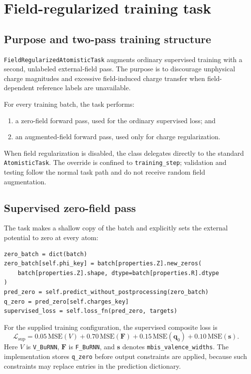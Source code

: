 \documentclass[11pt,a4paper]{article}
\newcommand{\vect}[1]{\bm{#1}}
\begin{document}
\appendix
\section{Field-regularized training task}
\label{app:field}

\subsection{Purpose and two-pass training structure}

\texttt{FieldRegularizedAtomisticTask} augments ordinary supervised training
with a second, unlabeled external-field pass.  The purpose is to discourage
unphysical charge magnitudes and excessive field-induced charge transfer when
field-dependent reference labels are unavailable.

For every training batch, the task performs:
\begin{enumerate}
  \item a zero-field forward pass, used for the ordinary supervised loss; and
  \item an augmented-field forward pass, used only for charge regularization.
\end{enumerate}
When field regularization is disabled, the class delegates directly to the
standard \texttt{AtomisticTask}.  The override is confined to
\texttt{training\_step}; validation and testing follow the normal task path and
do not receive random field augmentation.

\subsection{Supervised zero-field pass}

The task makes a shallow copy of the batch and explicitly sets the external
potential to zero at every atom:
\begin{lstlisting}[style=pythonstyle]
zero_batch = dict(batch)
zero_batch[self.phi_key] = batch[properties.Z].new_zeros(
    batch[properties.Z].shape, dtype=batch[properties.R].dtype
)
pred_zero = self.predict_without_postprocessing(zero_batch)
q_zero = pred_zero[self.charges_key]
supervised_loss = self.loss_fn(pred_zero, targets)
\end{lstlisting}
For the supplied training configuration, the supervised composite loss is
\begin{equation}
  \mathcal L_{\mathrm{sup}}
  =0.05\,\mathrm{MSE}(V)
  +0.70\,\mathrm{MSE}(\vect F)
  +0.15\,\mathrm{MSE}(\vect q_0)
  +0.10\,\mathrm{MSE}(\vect s).
  \label{eq:supervised-loss}
\end{equation}
Here $V$ is \texttt{V\_BuRNN}, $\vect F$ is \texttt{F\_BuRNN}, and $\vect s$
denotes \texttt{mbis\_valence\_widths}.  The implementation stores
\texttt{q\_zero} before output constraints are applied, because such constraints
may replace entries in the prediction dictionary.
\end{document}
